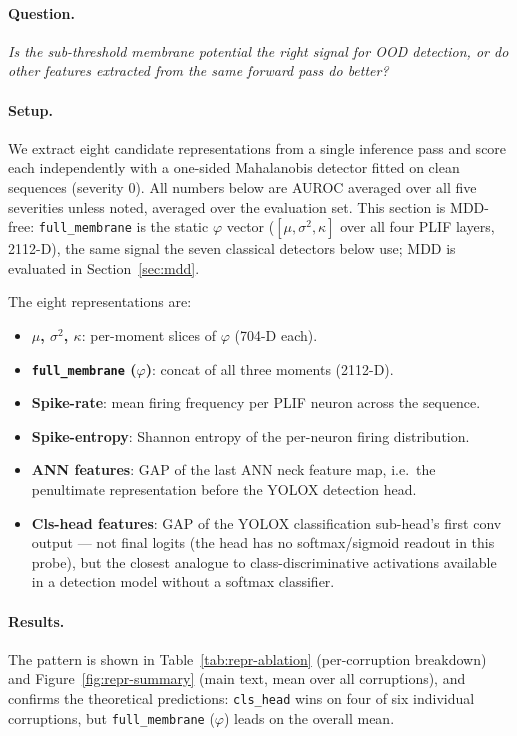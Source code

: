 ﻿\documentclass{article} %
\theoremstyle{remark}
\begin{document}
\paragraph{Question.}
\emph{Is the sub-threshold membrane potential the right signal for OOD detection, or do other
features extracted from the same forward pass do better?}

\paragraph{Setup.}
We extract eight candidate representations from a single
inference pass and score each independently with a one-sided Mahalanobis detector fitted on
clean sequences (severity 0).
All numbers below are AUROC averaged over all five severities unless noted, averaged over the
evaluation set. This section is MDD-free: \texttt{full\_membrane} is the
static $\varphi$ vector ($[\mu,\sigma^2,\kappa]$ over all four PLIF layers, 2112-D), the same signal
the seven classical detectors below use; MDD is evaluated in Section~\ref{sec:mdd}.

The eight representations are:
\begin{itemize}[nosep,leftmargin=1.2em]
  \item \textbf{$\mu$, $\sigma^2$, $\kappa$}: per-moment slices of $\varphi$ (704-D each).
  \item \textbf{\texttt{full\_membrane} ($\varphi$)}: concat of all three moments (2112-D).
  \item \textbf{Spike-rate}: mean firing frequency per PLIF neuron across the sequence.
  \item \textbf{Spike-entropy}: Shannon entropy of the per-neuron firing distribution.
  \item \textbf{ANN features}: GAP of the last ANN neck feature map,
    i.e.\ the penultimate representation before the YOLOX detection head.
  \item \textbf{Cls-head features}: GAP of the YOLOX classification sub-head's first conv output ---
    not final logits (the head has no softmax/sigmoid readout in this probe), but the
    closest analogue to class-discriminative activations available in a detection model
    without a softmax classifier.
\end{itemize}

\paragraph{Results.}
The pattern is shown in Table~\ref{tab:repr-ablation} (per-corruption breakdown) and
Figure~\ref{fig:repr-summary} (main text, mean over all corruptions), and confirms the
theoretical predictions: \texttt{cls\_head} wins on four of six individual corruptions, but
\texttt{full\_membrane} ($\varphi$) leads on the overall mean.
\end{document}
